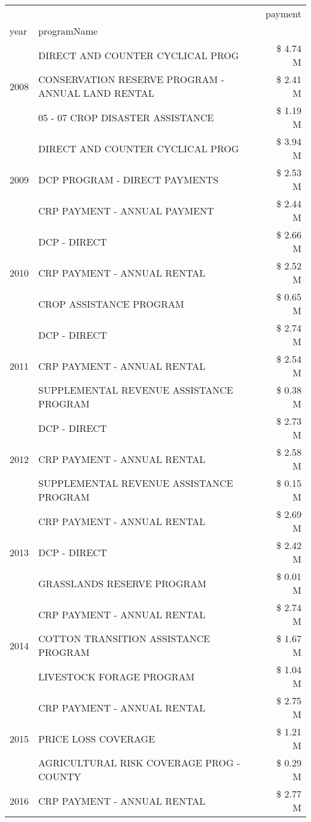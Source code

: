 \begin{tabular}{llr}
\toprule
 &  & payment \\
year & programName &  \\
\midrule
\multirow[t]{3}{*}{2008} & DIRECT AND COUNTER CYCLICAL PROG & \$ 4.74 M \\
 & CONSERVATION RESERVE PROGRAM - ANNUAL LAND RENTAL & \$ 2.41 M \\
 & 05 - 07 CROP DISASTER ASSISTANCE & \$ 1.19 M \\
\cline{1-3}
\multirow[t]{3}{*}{2009} & DIRECT AND COUNTER CYCLICAL PROG & \$ 3.94 M \\
 & DCP PROGRAM - DIRECT PAYMENTS & \$ 2.53 M \\
 & CRP PAYMENT - ANNUAL PAYMENT & \$ 2.44 M \\
\cline{1-3}
\multirow[t]{3}{*}{2010} & DCP - DIRECT & \$ 2.66 M \\
 & CRP PAYMENT - ANNUAL RENTAL & \$ 2.52 M \\
 & CROP ASSISTANCE PROGRAM & \$ 0.65 M \\
\cline{1-3}
\multirow[t]{3}{*}{2011} & DCP - DIRECT & \$ 2.74 M \\
 & CRP PAYMENT - ANNUAL RENTAL & \$ 2.54 M \\
 & SUPPLEMENTAL REVENUE ASSISTANCE PROGRAM & \$ 0.38 M \\
\cline{1-3}
\multirow[t]{3}{*}{2012} & DCP - DIRECT & \$ 2.73 M \\
 & CRP PAYMENT - ANNUAL RENTAL & \$ 2.58 M \\
 & SUPPLEMENTAL REVENUE ASSISTANCE PROGRAM & \$ 0.15 M \\
\cline{1-3}
\multirow[t]{3}{*}{2013} & CRP PAYMENT - ANNUAL RENTAL & \$ 2.69 M \\
 & DCP - DIRECT & \$ 2.42 M \\
 & GRASSLANDS RESERVE PROGRAM & \$ 0.01 M \\
\cline{1-3}
\multirow[t]{3}{*}{2014} & CRP PAYMENT - ANNUAL RENTAL & \$ 2.74 M \\
 & COTTON TRANSITION ASSISTANCE PROGRAM & \$ 1.67 M \\
 & LIVESTOCK FORAGE PROGRAM & \$ 1.04 M \\
\cline{1-3}
\multirow[t]{3}{*}{2015} & CRP PAYMENT - ANNUAL RENTAL & \$ 2.75 M \\
 & PRICE LOSS COVERAGE & \$ 1.21 M \\
 & AGRICULTURAL RISK COVERAGE PROG - COUNTY & \$ 0.29 M \\
\cline{1-3}
\multirow[t]{3}{*}{2016} & CRP PAYMENT - ANNUAL RENTAL & \$ 2.77 M \\

\end{tabular}
